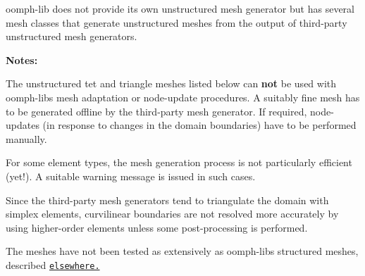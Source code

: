 {\ttfamily oomph-\/lib} does not provide its own unstructured mesh generator but has several mesh classes that generate unstructured meshes from the output of third-\/party unstructured mesh generators.

{\bfseries Notes\+:}
\begin{DoxyEnumerate}
\item The unstructured tet and triangle meshes listed below can {\bfseries not} be used with {\ttfamily oomph-\/lib\textquotesingle{}s} mesh adaptation or node-\/update procedures. A suitably fine mesh has to be generated offline by the third-\/party mesh generator. If required, node-\/updates (in response to changes in the domain boundaries) have to be performed manually. ~\newline
~\newline

\item For some element types, the mesh generation process is not particularly efficient (yet!). A suitable warning message is issued in such cases. ~\newline
~\newline

\item Since the third-\/party mesh generators tend to triangulate the domain with simplex elements, curvilinear boundaries are not resolved more accurately by using higher-\/order elements unless some post-\/processing is performed. ~\newline
~\newline

\item The meshes have not been tested as extensively as {\ttfamily oomph-\/lib\textquotesingle{}s} structured meshes, described \href{../../mesh_list/html/index.html}{\tt elsewhere.} ~\newline
~\newline

\end{DoxyEnumerate}

 

